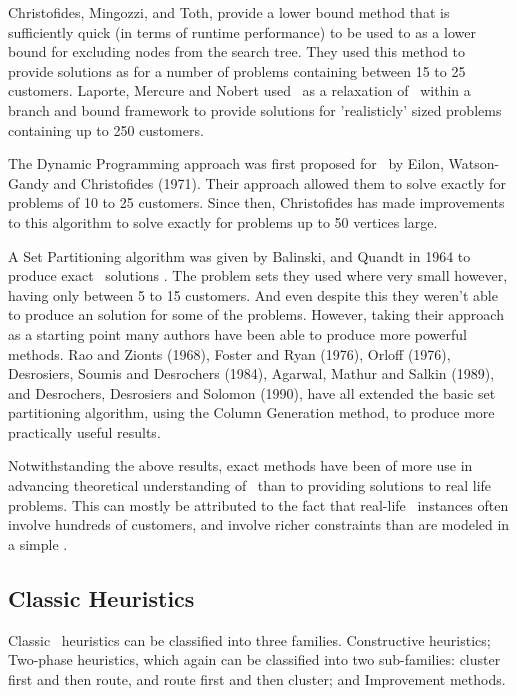 Christofides, Mingozzi, and Toth, \cite{CMT:1981} provide a lower bound method that is sufficiently quick (in terms of runtime performance) to be used to as a lower bound for excluding nodes from the search tree. They used this method to provide solutions as for a number of problems containing between 15 to 25 customers. Laporte, Mercure and Nobert \cite{LMN:1986} used \MTSP\ as a relaxation of \VRP\ within a branch and bound framework to provide solutions for 'realisticly' sized problems containing up to 250 customers.  

The Dynamic Programming approach was first proposed for \VRP\ by Eilon, Watson-Gandy and Christofides (1971). Their approach allowed them to solve exactly for problems of 10 to 25 customers. Since then, Christofides has made improvements to this algorithm to solve exactly for problems up to 50 vertices large.

A Set Partitioning algorithm was given by Balinski, and Quandt in 1964 to produce exact \VRP\ solutions \cite{balinski:64}. The problem sets they used where very small however, having only between 5 to 15 customers. And even despite this they weren't able to produce an solution for some of the problems. However, taking their approach as a starting point many authors have been able to produce more powerful methods. Rao and Zionts (1968), Foster and Ryan (1976), Orloff (1976), Desrosiers, Soumis and Desrochers (1984), Agarwal, Mathur and Salkin (1989), and Desrochers, Desrosiers and Solomon (1990), have all extended the basic set partitioning algorithm, using the Column Generation method, to produce more practically useful results. 

Notwithstanding the above results, exact methods have been of more use in advancing theoretical understanding of \VRP\ than to providing solutions to real life problems. This can mostly be attributed to the fact that real-life \VRP\ instances often involve hundreds of customers, and involve richer constraints than are modeled in a simple \VRP.

\subsection{Classic Heuristics}

Classic \VRP\ heuristics can be classified into three families. Constructive heuristics; Two-phase heuristics, which again can be classified into two sub-families: cluster first and then route, and route first and then cluster; and Improvement methods.

